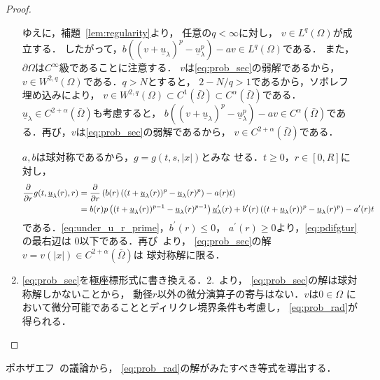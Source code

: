 \begin{proof}
\begin{enumerate}[1.]
        ゆえに，補題~\ref{lem:regularity}より，
        任意の$q < \infty$に対し，
        $v \in L^q(\Omega)$が成立する．
        したがって，$b \left( (v+ \underline{u}_\lambda)^p -
        \underline{u}_\lambda^p \right) - av \in L^q(\Omega)$である．
        また，$\partial \Omega$は$C^\infty$級であることに注意する．
        $v$は\ref{eq:prob_sec}の弱解であるから，
        $v \in W^{2, q}(\Omega)$である．$q > N$とすると，
        $2 - N /q > 1$であるから，ソボレフ埋め込みにより，
        $v \in W^{2, q}(\Omega) \subset C^1(\bar{\Omega}) \subset
        C^\alpha(\bar{\Omega})$である．$\underline{u}_\lambda \in C^{2 +
        \alpha}(\bar{\Omega})$も考慮すると，
        $b \left( (v+ \underline{u}_\lambda)^p -
        \underline{u}_\lambda^p \right) - av \in C^\alpha
        (\bar{\Omega})$であ
        る．再び，$v$は\ref{eq:prob_sec}の弱解であるから，
        $v \in C^{2+\alpha}(\bar{\Omega})$である．
        
        $a, b$は球対称であるから，$g = g(t, s, \lvert x \rvert)$とみな
        せる．$t \geq 0$，$r \in [0, R]$に対し，
        \begin{align}
         \frac{\partial }{\partial r} g(t, \underline{u}_\lambda(r), r)
         &= \frac{\partial }{\partial r} \left( b(r) \left( (t + \underline{u}
         _\lambda(r))^p -
         \underline{u}_\lambda(r)^p \right) - a(r) t \right) \notag \\
         &= b(r) p \left( (t+ \underline{u}_\lambda(r))^{p-1} -
         \underline{u}_\lambda(r)^{p-1} \right)
         \underline{u}_\lambda^\prime(r) + b^\prime(r) \left( (t +
         \underline{u}_\lambda(r))^p  - \underline{u}_\lambda(r)^p
         \right) - a^\prime(r) t \label{eq:pdifgtur}
        \end{align}
        である．\eqref{eq:under_u_r_prime}，$b^\prime(r) \leq 0$，
        $a^\prime(r) \geq 0$より，\eqref{eq:pdifgtur}の最右辺は
        $0$以下である．再び\cite{MR544879}~より，
        \ref{eq:prob_sec}の解
        $v = v(\lvert x \rvert) \in C^{2+\alpha}(\bar{\Omega})$は
        球対称解に限る．
  \item \ref{eq:prob_sec}を極座標形式に書き換える．2.~より，
        \ref{eq:prob_sec}の解は球対称解しかないことから，
        動径$r$以外の微分演算子の寄与はない．$v$は$0 \in \Omega$
        において微分可能であることとディリクレ境界条件も考慮し，
        \eqref{eq:prob_rad}が得られる．\qedhere
 \end{enumerate}
\end{proof}

ポホザエフ\cite{MR0192184}~の議論から，
\eqref{eq:prob_rad}の解がみたすべき等式を導出する．

